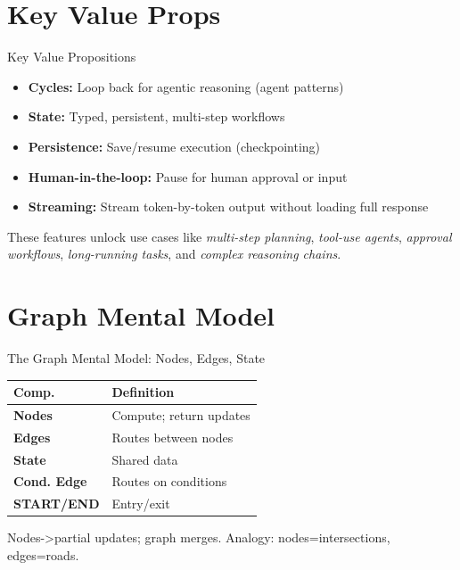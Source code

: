 \documentclass[aspectratio=169,11pt]{beamer}
\begin{document}
\section{Key Value Props}
\begin{frame}[t]{Key Value Propositions}
\setlength{\itemsep}{1pt}
\vspace{0.1cm}

\begin{tipbox}
\setlength{\itemsep}{1pt}
\begin{itemize}
  \item \textbf{Cycles:} Loop back for agentic reasoning (agent patterns)
  \item \textbf{State:} Typed, persistent, multi-step workflows
  \item \textbf{Persistence:} Save/resume execution (checkpointing)
  \item \textbf{Human-in-the-loop:} Pause for human approval or input
  \item \textbf{Streaming:} Stream token-by-token output without loading full response
\end{itemize}
\end{tipbox}

\vspace{0.15cm}

\begin{conceptbox}
These features unlock use cases like \textit{multi-step planning}, \textit{tool-use agents}, \textit{approval workflows}, \textit{long-running tasks}, and \textit{complex reasoning chains}.
\end{conceptbox}
\end{frame}

\section{Graph Mental Model}
\begin{frame}[t,shrink=5]{The Graph Mental Model: Nodes, Edges, State}
\setlength{\itemsep}{0.5pt}
\vspace{0.03cm}

{\footnotesize
\begin{tabular}{p{2.6cm}p{5.8cm}}
\toprule
\textbf{Comp.} & \textbf{Definition} \\
\midrule
\textbf{Nodes} & Compute; return updates \\
\textbf{Edges} & Routes between nodes \\
\textbf{State} & Shared data \\
\textbf{Cond. Edge} & Routes on conditions \\
\textbf{START/END} & Entry/exit \\
\bottomrule
\end{tabular}

Nodes->partial updates; graph merges. Analogy: nodes=intersections, edges=roads.
}
\end{frame}
\end{document}
